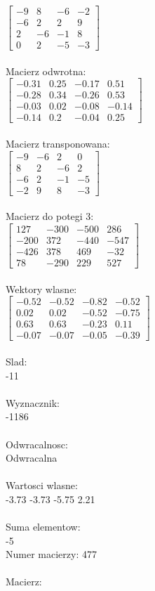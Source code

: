 \documentclass[a4paper,12pt]{article}
\begin{document}
$\begin{bmatrix} -9&8&-6&-2\\-6&2&2&9\\2&-6&-1&8\\0&2&-5&-3 \end{bmatrix}$
\\
\\
Macierz odwrotna:\\

$\begin{bmatrix} -0.31&0.25&-0.17&0.51\\-0.28&0.34&-0.26&0.53\\-0.03&0.02&-0.08&-0.14\\-0.14&0.2&-0.04&0.25 \end{bmatrix}$
\\
\\
Macierz transponowana:\\

$\begin{bmatrix} -9&-6&2&0\\8&2&-6&2\\-6&2&-1&-5\\-2&9&8&-3 \end{bmatrix}$
\\
\\
Macierz do potegi 3:\\

$\begin{bmatrix} 127&-300&-500&286\\-200&372&-440&-547\\-426&378&469&-32\\78&-290&229&527 \end{bmatrix}$
\\
\\
Wektory wlasne:\\

$\begin{bmatrix} -0.52&-0.52&-0.82&-0.52\\0.02&0.02&-0.52&-0.75\\0.63&0.63&-0.23&0.11\\-0.07&-0.07&-0.05&-0.39 \end{bmatrix}$
\\
\\
Slad:\\
-11
\\
\\
Wyznacznik:\\
-1186
\\
\\
Odwracalnosc:\\
Odwracalna
\\
\\
Wartosci wlasne:\\
-3.73 -3.73 -5.75 2.21
\\
\\
Suma elementow:\\
-5
\\
\newpage
Numer macierzy:
477
\\
\\
Macierz:\\
\end{document}
